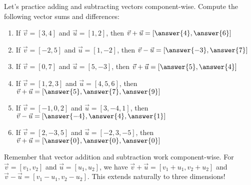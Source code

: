 \documentclass{ximera}
\begin{document}
\begin{problem}
    Let's practice adding and subtracting vectors component-wise. Compute the following vector sums and differences:
    \begin{enumerate}
        \item If $\vec{v}=[3,4]$ and $\vec{u}=[1,2]$, then $\vec{v}+\vec{u}=[\answer{4},\answer{6}]$
        \item If $\vec{v}=[-2,5]$ and $\vec{u}=[1,-2]$, then $\vec{v}-\vec{u}=[\answer{-3},\answer{7}]$
        \item If $\vec{v}=[0,7]$ and $\vec{u}=[5,-3]$, then $\vec{v}+\vec{u}=[\answer{5},\answer{4}]$
        \item If $\vec{v}=[1,2,3]$ and $\vec{u}=[4,5,6]$, then $\vec{v}+\vec{u}=[\answer{5},\answer{7},\answer{9}]$
        \item If $\vec{v}=[-1,0,2]$ and $\vec{u}=[3,-4,1]$, then $\vec{v}-\vec{u}=[\answer{-4},\answer{4},\answer{1}]$
        \item If $\vec{v}=[2,-3,5]$ and $\vec{u}=[-2,3,-5]$, then $\vec{v}+\vec{u}=[\answer{0},\answer{0},\answer{0}]$
    \end{enumerate}

    \begin{feedback}
        Remember that vector addition and subtraction work component-wise. For $\vec{v}=[v_1,v_2]$ and $\vec{u}=[u_1,u_2]$, we have $\vec{v}+\vec{u}=[v_1+u_1,v_2+u_2]$ and $\vec{v}-\vec{u}=[v_1-u_1,v_2-u_2]$. This extends naturally to three dimensions!
    \end{feedback}
\end{problem}
\end{document}
